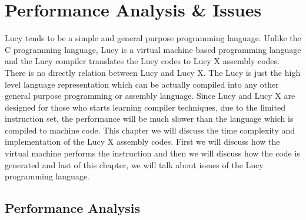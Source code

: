 \chapter{Performance Analysis \& Issues}
Lucy tends to be a simple and general purpose programming language. Unlike the C programming language, Lucy is a virtual machine based programming language and the Lucy compiler translates the Lucy codes to Lucy X assembly codes. There is no directly relation between Lucy and Lucy X. The Lucy is just the high level language representation which can be actually compiled into any other general purpose programming or assembly language. Since Lucy and Lucy X are designed for those who starts learning compiler techniques, due to the limited instruction set, the performance will be much slower than the language which is compiled to machine code. This chapter we will discuss the time complexity and implementation of the Lucy X assembly codes. First we will discuss how the virtual machine performs the instruction and then we will discuss how the code is generated and last of this chapter, we will talk about issues of the Lucy programming language.


\section{Performance Analysis}
